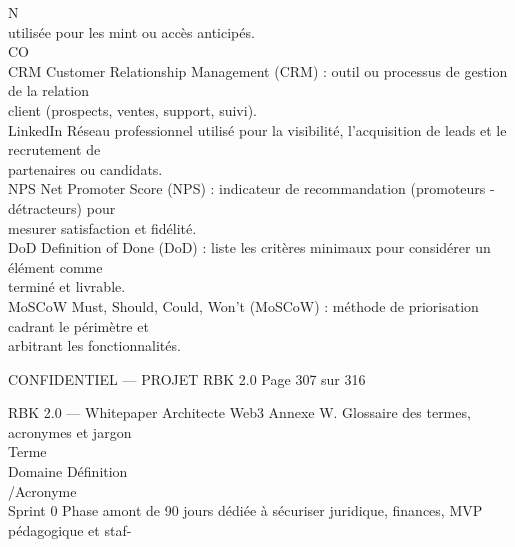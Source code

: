 \vspace{0.5em}
\vspace{0.5em}
\vspace{0.5em}
N\\
utilisée pour les mint ou accès anticipés.\\
CO\\
CRM                                     Customer Relationship Management (CRM) : outil ou processus de gestion de la relation\\
client (prospects, ventes, support, suivi).\\
\vspace{0.5em}
LinkedIn                                Réseau professionnel utilisé pour la visibilité, l’acquisition de leads et le recrutement de\\
partenaires ou candidats.\\
\vspace{0.5em}
NPS                                     Net Promoter Score (NPS) : indicateur de recommandation (promoteurs - détracteurs) pour\\
mesurer satisfaction et fidélité.\\
\vspace{0.5em}
DoD                                     Definition of Done (DoD) : liste les critères minimaux pour considérer un élément comme\\
terminé et livrable.\\
\vspace{0.5em}
MoSCoW                                  Must, Should, Could, Won’t (MoSCoW) : méthode de priorisation cadrant le périmètre et\\
arbitrant les fonctionnalités.\\
\vspace{0.5em}
\vspace{0.5em}
\vspace{0.5em}
\begin{confidential}CONFIDENTIEL — PROJET RBK 2.0                    Page 307 sur 316\end{confidential}
RBK 2.0 — Whitepaper Architecte Web3                                               Annexe W. Glossaire des termes, acronymes et jargon\\
\vspace{0.5em}
\vspace{0.5em}
Terme\\
Domaine    Définition\\
/Acronyme\\
Sprint 0                                Phase amont de 90 jours dédiée à sécuriser juridique, finances, MVP pédagogique et staf-\\
